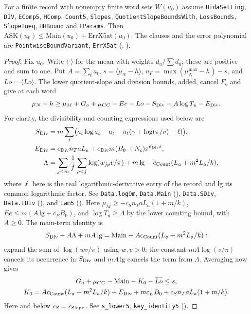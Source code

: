 \begin{formalstatement}
For a finite record with nonempty finite word sets $W(u_0)$ assume
\nolinkurl{HidaSetting}, \nolinkurl{DIV}, \nolinkurl{EComp5}, \nolinkurl{HComp},
\nolinkurl{Count5}, \nolinkurl{Slopes}, \nolinkurl{QuotientSlopeBoundsWith},
\nolinkurl{LossBounds}, \nolinkurl{SlopeIneq}, \nolinkurl{HHBound} and \nolinkurl{FParams}.
Then $\mathrm{ASK}(u_0)\le\mathrm{Main}(u_0)+\mathrm{ErrX5at}(u_0)$.
The clauses and the error polynomial are
\nolinkurl{PointwiseBoundVariant}, \nolinkurl{ErrX5at}
(;
).
\end{formalstatement}
\begin{proof}
Fix $u_0$. Write $\langle\cdot\rangle$ for the mean with weights
$d_u/\sum d_u$; these are positive and sum to one. Put $A=\sum_t a_t$,
$s=\langle\mu_N-h\rangle$, $u_F=\max(\mu_N^{\max}-h)-s$,
and $\overline{Lo}=\langle Lo\rangle$. The lower quotient-slope and division
bounds, added, cancel $F_o$ and give at each word
\[
 \mu_N-h\ge \mu_M+G_a+\mu_{CC}-Ee-Lo-S_{\rm Div}
                  +A\log T_u-E_{\rm Div}.
\]
For clarity, the divisibility and counting expressions used below are
\[
\begin{aligned}
 S_{\rm Div}&=m\sum_t\bigl(a_t\log a_t-a_t-a_t(\gamma+\log(\pi/v)-\ell)\bigr),\\
 E_{\rm Div}&=c_{\rm Div}n_TaL_a+c_{\rm Div}m(B_0+N_c)x^{e_{\rm Div}\varepsilon},\\
 \Lambda&=\sum_{j<m}\frac1f\sum_{\rho<f}\log(w_{j\rho}v/\pi)
             +m\,\mathrm{lg}-c_{\rm Count}(L_a+m^2L_a/k),
\end{aligned}
\]
where $\ell$ here is the real logarithmic-derivative entry of the record and
$\mathrm{lg}$ its common logarithmic factor. See \nolinkurl{Data.logOm},
\nolinkurl{Data.Main} (),
\nolinkurl{Data.SDiv}, \nolinkurl{Data.EDiv} (),
and \nolinkurl{Lam5} ().
Here $\mu_M\ge-c_Sn_TaL_a(1+m/k)$,
$Ee\le m(A\,\mathrm{lg}+c_E B_0)$, and $\log T_u\ge\Lambda$ by the
lower counting bound, with $A\ge0$. The main-term identity is
\[
 S_{\rm Div}-A\Lambda+mA\,\mathrm{lg}
   =\mathrm{Main}+A c_{\rm Count}(L_a+m^2L_a/k):
\]
expand the sum of $\log(wv/\pi)$ using $w,v>0$; the constant
$mA\log(v/\pi)$ cancels its occurrence in $S_{\rm Div}$ and
$mA\,\mathrm{lg}$ cancels the term from $\Lambda$. Averaging now gives
\[
 \begin{gathered}
 G_a+\mu_{CC}-\mathrm{Main}-K_0-\overline{Lo}\le s,\\
 K_0=A c_{\rm Count}(L_a+m^2L_a/k)+E_{\rm Div}+mc_EB_0+
               c_S n_T aL_a(1+m/k).
 \end{gathered}
\]
Here and below $c_S=c_{\rm Slope}$.
See \nolinkurl{s_lower5}, \nolinkurl{key_identity5}
().


\end{proof}
